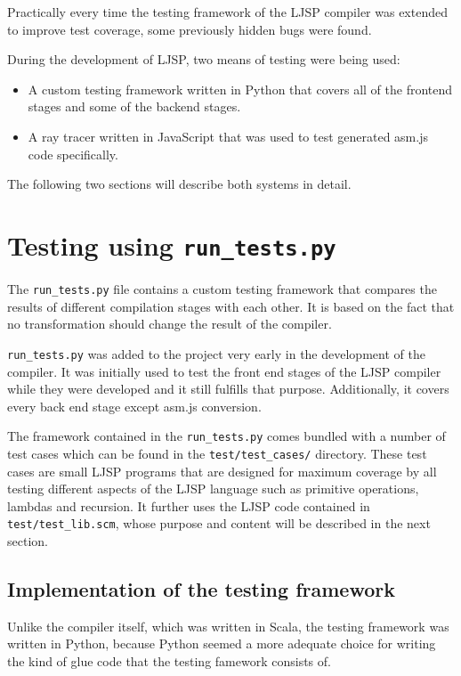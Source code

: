 \documentclass[11pt]{report}
\begin{document}
Practically every time the testing framework of the LJSP compiler was extended to improve test coverage, some previously hidden bugs were found.

During the development of LJSP, two means of testing were being used:
\begin{itemize}
\item A custom testing framework written in Python that covers all of the frontend stages and some of the backend stages.
\item A ray tracer written in JavaScript that was used to test generated asm.js code specifically.
\end{itemize}
The following two sections will describe both systems in detail.


\section{Testing using \texttt{run_tests.py}}
The \texttt{run_tests.py} file contains a custom testing framework that compares the results of different compilation stages with each other. It is based on the fact that no transformation should change the result of the compiler.

\texttt{run_tests.py} was added to the project very early in the development of the compiler. It was initially used to test the front end stages of the LJSP compiler while they were developed and it still fulfills that purpose. Additionally, it covers every back end stage except asm.js conversion.

The framework contained in the \texttt{run_tests.py} comes bundled with a number of test cases which can be found in the \texttt{test/test_cases/} directory. These test cases are small LJSP programs that are designed for maximum coverage by all testing different aspects of the LJSP language such as primitive operations, lambdas and recursion. It further uses the LJSP code contained in \texttt{test/test_lib.scm}, whose purpose and content will be described in the next section.

\subsection{Implementation of the testing framework}
Unlike the compiler itself, which was written in Scala, the testing framework was written in Python, because Python seemed a more adequate choice for writing the kind of glue code that the testing famework consists of.
\end{document}
